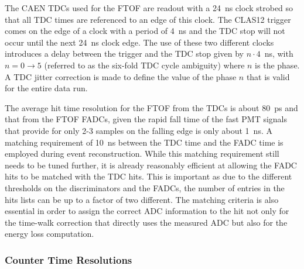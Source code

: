 \documentclass{elsart}
\begin{document}
The CAEN TDCs used for the FTOF are readout with a 24~ns clock strobed so that all TDC times are
referenced to an edge of this clock. The CLAS12 trigger comes on the edge of a clock with a period of
4~ns and the TDC stop will not occur until the next 24~ns clock edge. The use of these two different
clocks introduces a delay between the trigger and the TDC stop given by $n \cdot 4$~ns, with
$n = 0 \to 5$ (referred to as the six-fold TDC cycle ambiguity) where $n$ is the phase. A TDC jitter
correction is made to define the value of the phase $n$ that is valid for the entire data run.

The average hit time resolution for the FTOF from the TDCs is about 80~ps and that from the FTOF
FADCs, given the rapid fall time of the fast PMT signals that provide for only 2-3 samples on the falling
edge is only about 1~ns. A matching requirement of 10~ns between the TDC time and the FADC time is
employed during event reconstruction. While this matching requirement still needs to be tuned further,
it is already reasonably efficient at allowing the FADC hits to be matched with the TDC hits. This is
important as due to the different thresholds on the discriminators and the FADCs, the number of
entries in the hits lists can be up to a factor of two different. The matching criteria is also essential in
order to assign the correct ADC information to the hit not only for the time-walk correction that directly
uses the measured ADC but also for the energy loss computation.

\subsubsection{Counter Time Resolutions}
\label{tres-beam}
\end{document}
